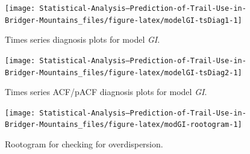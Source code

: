 \documentclass[
]{book}
\newenvironment{Shaded}{\begin{snugshade}}{\end{snugshade}}
\newcommand{\FunctionTok}[1]{\textcolor[rgb]{0.00,0.00,0.00}{#1}}
\newcommand{\NormalTok}[1]{#1}
\newcommand{\OtherTok}[1]{\textcolor[rgb]{0.56,0.35,0.01}{#1}}
\newcommand{\SpecialCharTok}[1]{\textcolor[rgb]{0.00,0.00,0.00}{#1}}
\begin{document}
\begin{figure}

{\centering \texttt{[image: Statistical-Analysis--Prediction-of-Trail-Use-in-Bridger-Mountains\_files/figure-latex/modelGI-tsDiag1-1]} 

}

\caption{Times series diagnosis plots for model \emph{GI}.}\label{fig:modelGI-tsDiag1}
\end{figure}

\begin{figure}

{\centering \texttt{[image: Statistical-Analysis--Prediction-of-Trail-Use-in-Bridger-Mountains\_files/figure-latex/modelGI-tsDiag2-1]} 

}

\caption{Times series ACF/pACF diagnosis plots for model \emph{GI}.}\label{fig:modelGI-tsDiag2}
\end{figure}

\begin{Shaded}
\end{Shaded}

\begin{figure}

{\centering \texttt{[image: Statistical-Analysis--Prediction-of-Trail-Use-in-Bridger-Mountains\_files/figure-latex/modGI-rootogram-1]} 

}

\caption{Rootogram for checking for overdispersion.}\label{fig:modGI-rootogram}
\end{figure}
\end{document}
